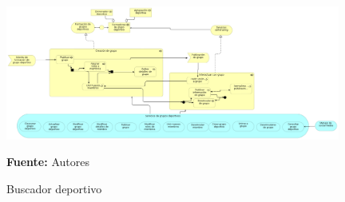 \begin{figure}[!htb]
  \begin{center}
    \includegraphics[width=11cm]{./imagenes/business_process/formaciongruposdeportivos.png}
    \caption{Buscador deportivo}
    \label{fig:BF_BuscadorDeportivo}
    \textbf{Fuente:}  Autores
  \end{center}
\end{figure}

